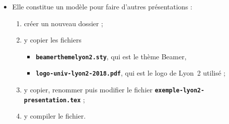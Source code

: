   \begin{itemize}
  \item Elle constitue un modèle pour faire d'autres présentations :
    
    \begin{enumerate}
    \item créer un nouveau dossier ;
    \item y copier les fichiers 

      \begin{itemize}
      \item \texttt{\textbf{beamerthemelyon2.sty}}, qui est le thème Beamer,
      \item \texttt{\textbf{logo-univ-lyon2-2018.pdf}}, qui est le logo de Lyon~2 utilisé ;
      \end{itemize}

    \item y copier, renommer puis modifier le fichier \texttt{\textbf{exemple-lyon2-presentation.tex}} ;
    \item y compiler le fichier.
    \end{enumerate}
  \end{itemize}
